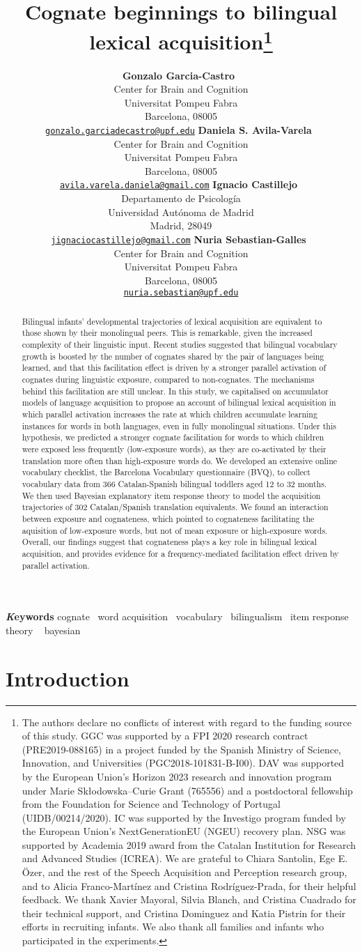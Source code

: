 \documentclass[
]{article}
\title{Cognate beginnings to bilingual lexical acquisition\thanks{The
authors declare no conflicts of interest with regard to the funding
source of this study. GGC was supported by a FPI 2020 research contract
(PRE2019-088165) in a project funded by the Spanish Ministry of Science,
Innovation, and Universities (PGC2018-101831-B-I00). DAV was supported
by the European Union's Horizon 2023 research and innovation program
under Marie Skłodowska--Curie Grant (765556) and a postdoctoral
fellowship from the Foundation for Science and Technology of Portugal
(UIDB/00214/2020). IC was supported by the Investigo program funded by
the European Union's NextGenerationEU (NGEU) recovery plan. NSG was
supported by Academia 2019 award from the Catalan Institution for
Research and Advanced Studies (ICREA). We are grateful to Chiara
Santolin, Ege E. Özer, and the rest of the Speech Acquisition and
Perception research group, and to Alicia Franco-Martínez and Cristina
Rodríguez-Prada, for their helpful feedback. We thank Xavier Mayoral,
Silvia Blanch, and Cristina Cuadrado for their technical support, and
Cristina Dominguez and Katia Pistrin for their efforts in recruiting
infants. We also thank all families and infants who participated in the
experiments.}}
\author{
\textbf{Gonzalo Garcia-Castro}~\orcidlink{0000-0002-8553-4209}\\Center
for Brain and Cognition\\Universitat Pompeu Fabra\\Barcelona,
08005\\\texttt{\href{mailto:gonzalo.garciadecastro@upf.edu}{gonzalo.garciadecastro@upf.edu}}\And
\textbf{Daniela S. Avila-Varela}~\orcidlink{0000-0002-3518-8117}\\Center
for Brain and Cognition\\Universitat Pompeu Fabra\\Barcelona,
08005\\\texttt{\href{mailto:avila.varela.daniela@gmail.com}{avila.varela.daniela@gmail.com}}\And
\textbf{Ignacio
Castillejo}~\orcidlink{0000-0001-7445-0416}\\Departamento de
Psicología\\Universidad Autónoma de Madrid\\Madrid,
28049\\\texttt{\href{mailto:jignaciocastillejo@gmail.com}{jignaciocastillejo@gmail.com}}\And
\textbf{Nuria Sebastian-Galles}~\orcidlink{0000-0001-6938-2498}\\Center
for Brain and Cognition\\Universitat Pompeu Fabra\\Barcelona,
08005\\\texttt{\href{mailto:nuria.sebastian@upf.edu}{nuria.sebastian@upf.edu}}}
\date{}
\begin{document}
\maketitle
\begin{abstract}
Bilingual infants' developmental trajectories of lexical acquisition are
equivalent to those shown by their monolingual peers. This is
remarkable, given the increased complexity of their linguistic input.
Recent studies suggested that bilingual vocabulary growth is boosted by
the number of cognates shared by the pair of languages being learned,
and that this facilitation effect is driven by a stronger parallel
activation of cognates during linguistic exposure, compared to
non-cognates. The mechanisms behind this facilitation are still unclear.
In this study, we capitalised on accumulator models of language
acquisition to propose an account of bilingual lexical acquisition in
which parallel activation increases the rate at which children
accumulate learning instances for words in both languages, even in fully
monolingual situations. Under this hypothesis, we predicted a stronger
cognate facilitation for words to which children were exposed less
frequently (low-exposure words), as they are co-activated by their
translation more often than high-exposure words do. We developed an
extensive online vocabulary checklist, the Barcelona Vocabulary
questionnaire (BVQ), to collect vocabulary data from 366 Catalan-Spanish
bilingual toddlers aged 12 to 32 months. We then used Bayesian
explanatory item response theory to model the acquisition trajectories
of 302 Catalan/Spanish translation equivalents. We found an interaction
between exposure and cognateness, which pointed to cognateness
facilitating the aquisition of low-exposure words, but not of mean
exposure or high-exposure words. Overall, our findings suggest that
cognateness plays a key role in bilingual lexical acquisition, and
provides evidence for a frequency-mediated facilitation effect driven by
parallel activation.
\end{abstract}
{\bfseries \emph Keywords}
\def\sep{\textbullet\ }
cognate \sep word
acquisition \sep vocabulary \sep bilingualism \sep item response
theory \sep 
bayesian

\ifdefined\Shaded\renewenvironment{Shaded}{\begin{tcolorbox}[borderline west={3pt}{0pt}{shadecolor}, interior hidden, frame hidden, breakable, boxrule=0pt, enhanced, sharp corners]}{\end{tcolorbox}}\fi

\hypertarget{introduction}{%
\section{Introduction}\label{introduction}}
\end{document}
